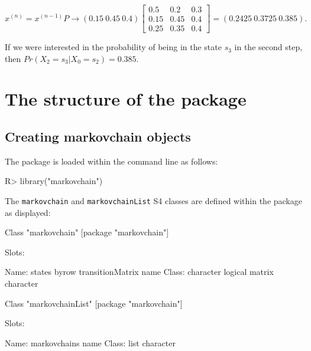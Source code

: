 \documentclass[
  nojss]{jss}
\begin{document}
\begin{equation}
x^{(n)}=x^{(n-1)}P \to \left(0.15\:0.45\:0.4\right)\left[\begin{array}{ccc}
0.5 & 0.2 & 0.3\\
0.15 & 0.45 & 0.4\\
0.25 & 0.35 & 0.4
\end{array}\right]=\left(0.2425\:0.3725\:0.385\right).
\label{eq:trPropExEx3}
\end{equation}

If we were interested in the probability of being in the state \(s_{3}\) in the second step, then \(Pr\left(X_{2}=s_{3}\left|X_{0}=s_{2}\right.\right)=0.385\).

\newpage

\section{The structure of the package}\label{sec:structure}

\subsection{Creating markovchain objects}\label{creating-markovchain-objects}

The package is loaded within the  command line as follows:

\begin{CodeChunk}
\begin{CodeInput}
R> library("markovchain")
\end{CodeInput}
\end{CodeChunk}

The \texttt{markovchain} and \texttt{markovchainList} S4 classes \citep{chambers} are defined within the  package as displayed:

\begin{CodeChunk}
\begin{CodeOutput}
Class "markovchain" [package "markovchain"]

Slots:
                                                                          
Name:            states            byrow transitionMatrix             name
Class:        character          logical           matrix        character
\end{CodeOutput}
\begin{CodeOutput}
Class "markovchainList" [package "markovchain"]

Slots:
                                
Name:  markovchains         name
Class:         list    character
\end{CodeOutput}
\end{CodeChunk}
\end{document}
